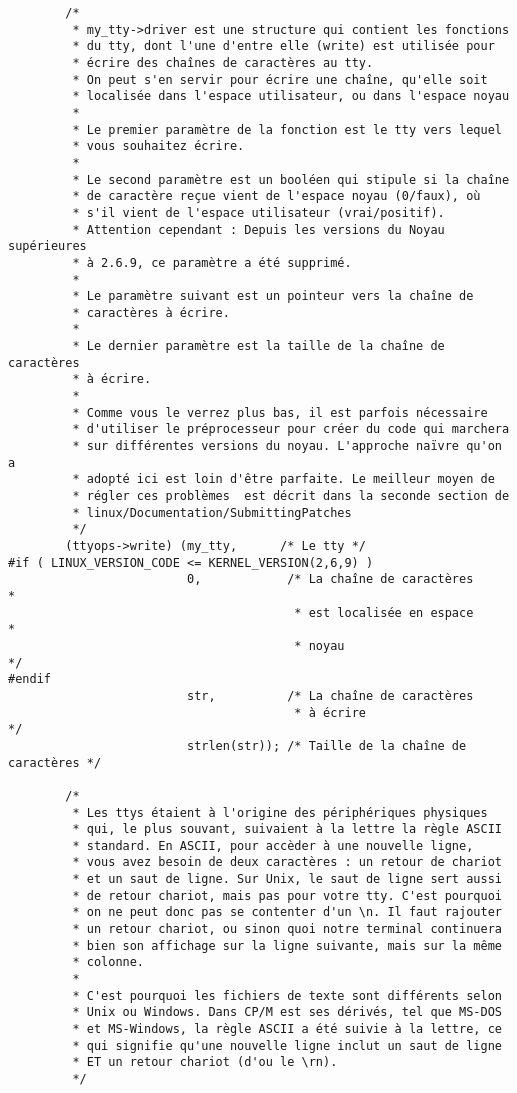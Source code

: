 \documentclass[11pt]{article}
\begin{document}
\begin{verbatim}
        /*
         * my_tty->driver est une structure qui contient les fonctions
         * du tty, dont l'une d'entre elle (write) est utilisée pour
         * écrire des chaînes de caractères au tty.
         * On peut s'en servir pour écrire une chaîne, qu'elle soit
         * localisée dans l'espace utilisateur, ou dans l'espace noyau
         *
         * Le premier paramètre de la fonction est le tty vers lequel
         * vous souhaitez écrire.
         *
         * Le second paramètre est un booléen qui stipule si la chaîne
         * de caractère reçue vient de l'espace noyau (0/faux), où
         * s'il vient de l'espace utilisateur (vrai/positif).
         * Attention cependant : Depuis les versions du Noyau supérieures
         * à 2.6.9, ce paramètre a été supprimé.
         *
         * Le paramètre suivant est un pointeur vers la chaîne de
         * caractères à écrire.
         *
         * Le dernier paramètre est la taille de la chaîne de caractères
         * à écrire.
         *
         * Comme vous le verrez plus bas, il est parfois nécessaire
         * d'utiliser le préprocesseur pour créer du code qui marchera
         * sur différentes versions du noyau. L'approche naïvre qu'on a
         * adopté ici est loin d'être parfaite. Le meilleur moyen de
         * régler ces problèmes  est décrit dans la seconde section de
         * linux/Documentation/SubmittingPatches
         */
        (ttyops->write) (my_tty,      /* Le tty */
#if ( LINUX_VERSION_CODE <= KERNEL_VERSION(2,6,9) )
                         0,            /* La chaîne de caractères           *
                                        * est localisée en espace           *
                                        * noyau                             */
#endif
                         str,          /* La chaîne de caractères
                                        * à écrire                          */
                         strlen(str)); /* Taille de la chaîne de caractères */

        /*
         * Les ttys étaient à l'origine des périphériques physiques
         * qui, le plus souvant, suivaient à la lettre la règle ASCII
         * standard. En ASCII, pour accèder à une nouvelle ligne,
         * vous avez besoin de deux caractères : un retour de chariot
         * et un saut de ligne. Sur Unix, le saut de ligne sert aussi
         * de retour chariot, mais pas pour votre tty. C'est pourquoi
         * on ne peut donc pas se contenter d'un \n. Il faut rajouter
         * un retour chariot, ou sinon quoi notre terminal continuera
         * bien son affichage sur la ligne suivante, mais sur la même
         * colonne.
         *
         * C'est pourquoi les fichiers de texte sont différents selon
         * Unix ou Windows. Dans CP/M est ses dérivés, tel que MS-DOS
         * et MS-Windows, la règle ASCII a été suivie à la lettre, ce
         * qui signifie qu'une nouvelle ligne inclut un saut de ligne
         * ET un retour chariot (d'ou le \rn).
         */


\end{verbatim}
\end{document}
